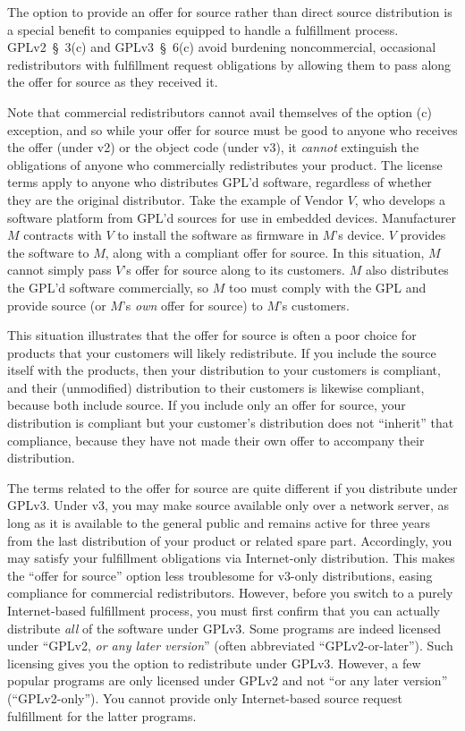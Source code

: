 The option to provide an offer for source rather than direct source
distribution is a special benefit to companies equipped to handle a
fulfillment process.  GPLv2~\S~3(c) and GPLv3~\S~6(c) avoid burdening
noncommercial, occasional redistributors with fulfillment request
obligations by allowing them to pass along the offer for source as they
received it.

Note that commercial redistributors cannot avail themselves of the option
(c) exception, and so while your offer for source must be good to anyone
who receives the offer (under v2) or the object code (under v3), it
\emph{cannot} extinguish the obligations of anyone who commercially
redistributes your product.  The license terms apply to anyone who
distributes GPL'd software, regardless of whether they are the original
distributor.  Take the example of Vendor $V$, who develops a software
platform from GPL'd sources for use in embedded devices.  Manufacturer $M$
contracts with $V$ to install the software as firmware in $M$'s device.
$V$ provides the software to $M$, along with a compliant offer for source.
In this situation, $M$ cannot simply pass $V$'s offer for source along to
its customers.  $M$ also distributes the GPL'd software commercially, so
$M$ too must comply with the GPL and provide source (or $M$'s \emph{own}
offer for source) to $M$'s customers.

This situation illustrates that the offer for source is often a poor
choice for products that your customers will likely redistribute.  If you
include the source itself with the products, then your distribution to
your customers is compliant, and their (unmodified) distribution to their
customers is likewise compliant, because both include source.  If you
include only an offer for source, your distribution is compliant but your
customer's distribution does not ``inherit'' that compliance, because they
have not made their own offer to accompany their distribution.

The terms related to the offer for source are quite different if you
distribute under GPLv3.  Under v3, you may make source available only over
a network server, as long as it is available to the general public and
remains active for three years from the last distribution of your product
or related spare part.  Accordingly, you may satisfy your fulfillment
obligations via Internet-only distribution.  This makes the ``offer for
source'' option less troublesome for v3-only distributions, easing
compliance for commercial redistributors.  However, before you switch to a
purely Internet-based fulfillment process, you must first confirm that you
can actually distribute \emph{all} of the software under GPLv3.  Some
programs are indeed licensed under ``GPLv2, \emph{or any later version}''
(often abbreviated ``GPLv2-or-later'').  Such licensing gives you the
option to redistribute under GPLv3.  However, a few popular programs are
only licensed under GPLv2 and not ``or any later version''
(``GPLv2-only'').  You cannot provide only Internet-based source request
fulfillment for the latter programs.


